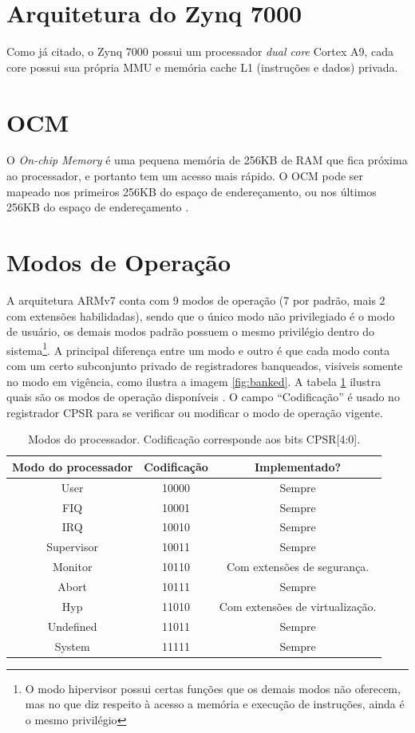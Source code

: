 \section{Arquitetura do Zynq 7000}
Como já citado, o Zynq 7000 possui um processador \emph{dual core} Cortex A9, cada core possui sua própria MMU e memória cache L1 (instruções e dados) privada.

\section{OCM} O \emph{On-chip Memory} é uma pequena memória de 256KB de RAM que fica próxima ao processador, e portanto tem um acesso mais rápido. O OCM pode ser mapeado nos primeiros 256KB do espaço de endereçamento, ou nos últimos 256KB do espaço de endereçamento \cite{ug585}.


\section{Modos de Operação}
\label{sec:operating_modes}
A arquitetura ARMv7 conta com 9 modos de operação (7 por padrão, mais 2 com extensões habilidadas), sendo que o único modo não privilegiado é o modo de usuário, os demais modos padrão possuem o mesmo privilégio dentro do sistema\footnote{O modo hipervisor possui certas funções que os demais modos não oferecem, mas no que diz respeito à acesso a memória e execução de instruções, ainda é o mesmo privilégio}. A principal diferença entre um modo e outro é que cada modo conta com um certo subconjunto privado de registradores banqueados, visiveis somente no modo em vigência, como ilustra a imagem \ref{fig:banked}. A tabela \ref{tab:processormode} ilustra quais são os modos de operação disponíveis \cite[p.~1139]{armarm}.
O campo ``Codificação'' é usado no registrador CPSR para se verificar ou modificar o modo de operação vigente.

\begin{table}[ht]
\centering
\begin{tabular}{ccc}
\hline\hline                        %
Modo do processador  & Codificação & Implementado?\\ [0.5ex] %
\hline                  %
User & 10000 & Sempre \\
FIQ & 10001 & Sempre \\
IRQ & 10010 & Sempre \\
Supervisor & 10011 & Sempre\\
Monitor & 10110 & Com extensões de segurança.\\
Abort & 10111 & Sempre\\
Hyp & 11010 & Com extensões de virtualização.\\
Undefined & 11011 & Sempre\\
System & 11111 & Sempre\\[1ex]
\hline %
\end{tabular}
\caption{Modos do processador. Codificação corresponde aos bits CPSR[4:0].}
\label{tab:processormode} %
\end{table}


